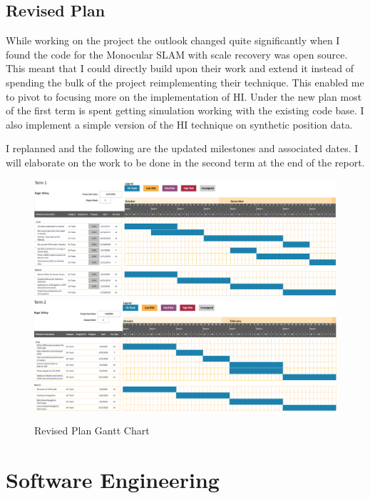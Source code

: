 \documentclass[]{../resources/final_report}
\begin{document}
\pagebreak
\section{Revised Plan}

While working on the project the outlook changed quite significantly when I found the code for 
the Monocular SLAM with scale recovery was open source. This meant that I could directly build 
upon their work and extend it instead of spending the bulk of the project reimplementing their 
technique. This enabled me to pivot to focusing more on the implementation of HI. 
Under the new plan most of the first term is spent getting simulation working with the existing 
code base. I also implement a simple version of the HI technique on synthetic 
position data.

I replanned and the following are the updated milestones and associated dates. I will elaborate 
on the work to be done in the second term at the end of the report.
\\
\begin{figure}[h]
  \centering
  \includegraphics[width=\textwidth]{Term1GanttChart.png}
  \includegraphics[width=\textwidth]{Term2GanttChart.png}
  \caption{Revised Plan Gantt Chart}
  \label{}
\end{figure}


\chapter{Software Engineering}
\end{document}
